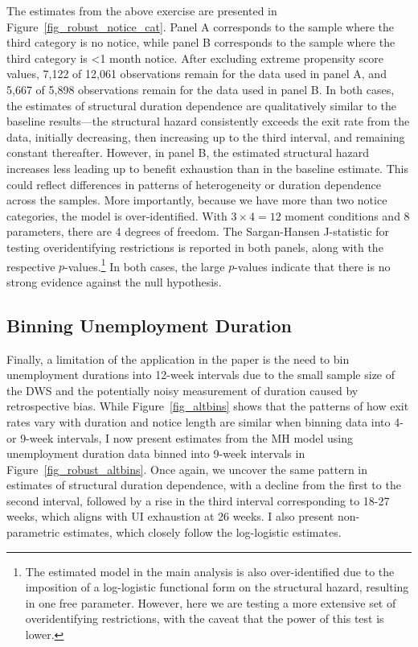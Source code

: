 \documentclass{div}
\begin{document}
The estimates from the above exercise are presented in Figure~\ref{fig_robust_notice_cat}. Panel A corresponds to the sample where the third category is no notice, while panel B corresponds to the sample where the third category is <1 month notice. After excluding extreme propensity score values, 7,122 of 12,061 observations remain for the data used in panel A, and 5,667 of 5,898 observations remain for the data used in panel B. In both cases, the estimates of structural duration dependence are qualitatively similar to the baseline results—the structural hazard consistently exceeds the exit rate from the data, initially decreasing, then increasing up to the third interval, and remaining constant thereafter. However, in panel B, the estimated structural hazard increases less leading up to benefit exhaustion than in the baseline estimate. This could reflect differences in patterns of heterogeneity or duration dependence across the samples. More importantly, because we have more than two notice categories, the model is over-identified. With $3 \times 4 = 12$ moment conditions and 8 parameters, there are 4 degrees of freedom. The Sargan-Hansen J-statistic for testing overidentifying restrictions is reported in both panels, along with the respective $p$-values.\footnote{The estimated model in the main analysis is also over-identified due to the imposition of a log-logistic functional form on the structural hazard, resulting in one free parameter. However, here we are testing a more extensive set of overidentifying restrictions, with the caveat that the power of this test is lower.} In both cases, the large $p$-values indicate that there is no strong evidence against the null hypothesis.

\subsection{Binning Unemployment Duration}\label{subsec_binning}

Finally, a limitation of the application in the paper is the need to bin unemployment durations into 12-week intervals due to the small sample size of the DWS and the potentially noisy measurement of duration caused by retrospective bias. While Figure~\ref{fig_altbins} shows that the patterns of how exit rates vary with duration and notice length are similar when binning data into 4- or 9-week intervals, I now present estimates from the MH model using unemployment duration data binned into 9-week intervals in Figure~\ref{fig_robust_altbins}. Once again, we uncover the same pattern in estimates of structural duration dependence, with a decline from the first to the second interval, followed by a rise in the third interval corresponding to 18-27 weeks, which aligns with UI exhaustion at 26 weeks. I also present non-parametric estimates, which closely follow the log-logistic estimates.
\end{document}
